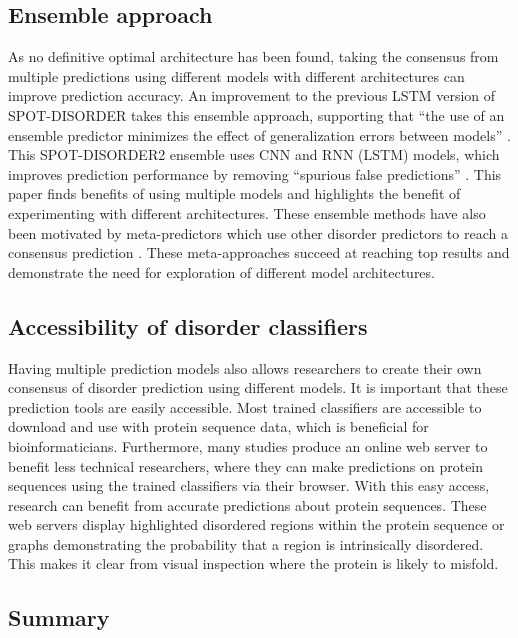\documentclass{l4proj}
\begin{document}
\subsection{Ensemble approach}

As no definitive optimal architecture has been found, taking the consensus from multiple predictions using different models with different architectures can improve prediction accuracy. An improvement to the previous LSTM version of SPOT-DISORDER takes this ensemble approach, supporting that “the use of an ensemble predictor minimizes the effect of generalization errors between models” \citep{Hanson:19}. This SPOT-DISORDER2 ensemble uses CNN and RNN (LSTM) models, which improves prediction performance by removing “spurious false predictions” \citep{Hanson:19}. This paper finds benefits of using multiple models and highlights the benefit of experimenting with different architectures. These ensemble methods have also been motivated by meta-predictors which use other disorder predictors to reach a consensus prediction \citep{Emenecker:21}. These meta-approaches succeed at reaching top results and demonstrate the need for exploration of different model architectures.

\subsection{Accessibility of disorder classifiers}

Having multiple prediction models also allows researchers to create their own consensus of disorder prediction using different models. It is important that these prediction tools are easily accessible. Most trained classifiers are accessible to download and use with protein sequence data, which is beneficial for bioinformaticians. Furthermore, many studies produce an online web server to benefit less technical researchers, where they can make predictions on protein sequences using the trained classifiers via their browser. With this easy access, research can benefit from accurate predictions about protein sequences. These web servers display highlighted disordered regions within the protein sequence or graphs demonstrating the probability that a region is intrinsically disordered. This makes it clear from visual inspection where the protein is likely to misfold.

\subsection{Summary}
\end{document}
